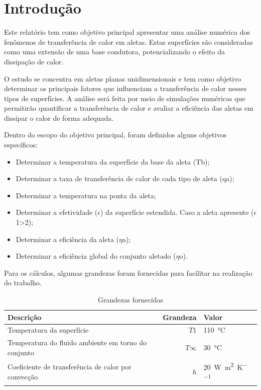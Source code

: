 \chapter{Introdução}\label{cap:introducao}

Este relatório tem como objetivo principal apresentar uma análise numérica dos fenômenos de transferência de calor em aletas. Estas superfícies são consideradas como uma extensão de uma base condutora, potencializando o efeito da dissipação de calor.

O estudo se concentra em aletas planas unidimensionais e tem como objetivo determinar os principais fatores que influenciam a transferência de calor nesses tipos de superfícies. A análise será feita por meio de simulações numéricas que permitirão quantificar a transferência de calor e avaliar a eficiência das aletas em dissipar o calor de forma adequada.

Dentro do escopo do objetivo principal, foram definidos alguns objetivos específicos:

\begin{itemize}
   \item Determinar a temperatura da superfície da base da aleta (Tb);
   
   \item Determinar a taxa de transferência de calor de cada tipo de aleta (qa);
   
   \item Determinar a temperatura na ponta da aleta;
   
   \item Determinar a efetividade ({\large \(\epsilon\)}) da superfície estendida. Caso a aleta apresente ({\large\(\epsilon\)}1>2);

   \item Determinar a eficiência da aleta ({\large\(\eta\)}a);
   
   \item Determinar a eficiência global do conjunto aletado ({\large\({\eta}\)}o).
\end{itemize}

Para os cálculos, algumas grandezas foram fornecidas para facilitar na realização do trabalho.

\begin{table}[htb]
   \ABNTEXfontereduzida
   \centering
   \caption{Grandezas fornecidas}
   \label{tab:grandezasFornecidas}
   \begin{tabular}{p{8.15cm} r R{2.3cm}}\toprule
      Descrição & Grandeza & Valor\\
      \midrule
      Temperatura da superfície & \(T1\) & \SI{110}\degreeCelsius \\
      Temperatura do fluido ambiente em torno do conjunto & \(T\infty\) & \SI{30}\degreeCelsius \\
      Coeficiente de transferência de calor por convecção & \(h\) & \SI{20}{\watt\per\square\meter\per\kelvin} \\
      \bottomrule
   \end{tabular}
   \fonteproprioautor
\end{table}

